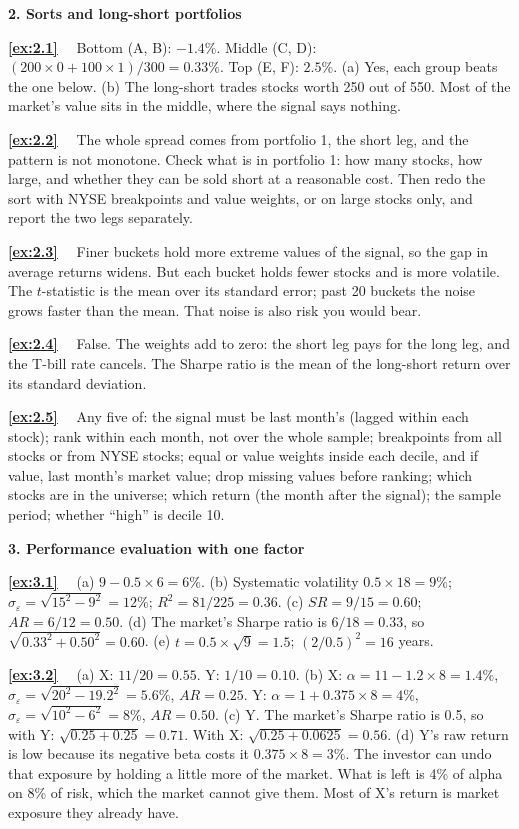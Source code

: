 \documentclass[11pt]{article}
\newcounter{ex}[section]
\newcommand{\sol}[1]{\par\smallskip\textbf{\ref{#1}}\ \ }
\newcommand{\head}[1]{\par\medskip\textbf{#1}\par}
\newcommand{\SR}{\mathit{SR}}
\newcommand{\AR}{\mathit{AR}}
\begin{document}
{\head{2. Sorts and long-short portfolios}

\sol{ex:2.1} Bottom (A, B): $-1.4\%$. Middle (C, D): $(200\times 0 + 100\times 1)/300 = 0.33\%$. Top (E, F): $2.5\%$.
(a) Yes, each group beats the one below. (b) The long-short trades stocks worth 250 out of 550. Most of the market's
value sits in the middle, where the signal says nothing.

\sol{ex:2.2} The whole spread comes from portfolio 1, the short leg, and the pattern is not monotone. Check what is
in portfolio 1: how many stocks, how large, and whether they can be sold short at a reasonable cost. Then redo the sort
with NYSE breakpoints and value weights, or on large stocks only, and report the two legs separately.

\sol{ex:2.3} Finer buckets hold more extreme values of the signal, so the gap in average returns widens. But each
bucket holds fewer stocks and is more volatile. The $t$-statistic is the mean over its standard error; past 20 buckets
the noise grows faster than the mean. That noise is also risk you would bear.

\sol{ex:2.4} False. The weights add to zero: the short leg pays for the long leg, and the T-bill rate cancels. The Sharpe
ratio is the mean of the long-short return over its standard deviation.

\sol{ex:2.5} Any five of: the signal must be last month's (lagged within each stock); rank within each month, not over
the whole sample; breakpoints from all stocks or from NYSE stocks; equal or value weights inside each decile, and if
value, last month's market value; drop missing values before ranking; which stocks are in the universe; which return
(the month after the signal); the sample period; whether ``high'' is decile 10.

\head{3. Performance evaluation with one factor}

\sol{ex:3.1} (a) $9 - 0.5\times 6 = 6\%$. (b) Systematic volatility $0.5\times 18 = 9\%$; $\sigma_{\varepsilon} =
\sqrt{15^{2} - 9^{2}} = 12\%$; $R^{2} = 81/225 = 0.36$. (c) $\SR = 9/15 = 0.60$; $\AR = 6/12 = 0.50$. (d) The market's
Sharpe ratio is $6/18 = 0.33$, so $\sqrt{0.33^{2} + 0.50^{2}} = 0.60$. (e) $t = 0.5\times\sqrt{9} = 1.5$; $(2/0.5)^{2} = 16$
years.

\sol{ex:3.2} (a) X: $11/20 = 0.55$. Y: $1/10 = 0.10$. (b) X: $\alpha = 11 - 1.2\times 8 = 1.4\%$, $\sigma_{\varepsilon} =
\sqrt{20^{2} - 19.2^{2}} = 5.6\%$, $\AR = 0.25$. Y: $\alpha = 1 + 0.375\times 8 = 4\%$, $\sigma_{\varepsilon} = \sqrt{10^{2} - 6^{2}} = 8\%$,
$\AR = 0.50$. (c) Y. The market's Sharpe ratio is 0.5, so with Y: $\sqrt{0.25 + 0.25} = 0.71$. With X: $\sqrt{0.25 + 0.0625}
= 0.56$. (d) Y's raw return is low because its negative beta costs it $0.375\times 8 = 3\%$. The investor can undo that
exposure by holding a little more of the market. What is left is 4\% of alpha on 8\% of risk, which the market cannot give
them. Most of X's return is market exposure they already have.

}
\end{document}
